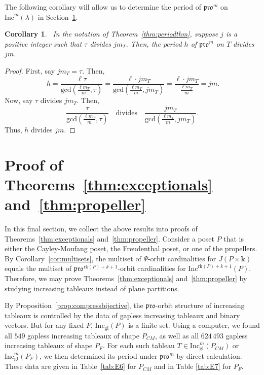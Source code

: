 \documentclass[12pt]{amsart}
\newtheorem{corollary}[theorem]{Corollary}
\theoremstyle{definition}
\theoremstyle{remark}
\numberwithin{equation}{section}
\newcommand{\inc}{\ensuremath{\mathrm{Inc}}}
\newcommand{\incgl}{\inc_{\mathrm{gl}}}
\newcommand{\pro}{\mathfrak{pro}}
\newcommand{\rank}{\ensuremath{\mathrm{rk}}}
\begin{document}
The following corollary will allow us to determine the period of $\pro^m$ on $\inc^m(\lambda)$ in Section~\ref{sec:arithmetic}. 
\\
\begin{corollary}~\label{corr:pdbound}
In the notation of Theorem~\ref{thm:periodthm}, suppose $j$ is a positive integer such that $\tau$ divides $j m_T$. Then, the period $h$ of $\pro^m$ on $T$ divides $j m$. 
\end{corollary} 
\begin{proof}
First, say $j m_T = \tau$. Then,
\begin{equation}~\label{eq:pdbound} h=  \frac{\ell \tau}{\text{gcd}(\frac{\ell m_T}{m},\tau)} = \frac{\ell \cdot j m_T}{\text{gcd}(\frac{\ell m_T}{m},j m_T)} = \frac{\ell \cdot j m_T}{\frac{\ell m_T}{m}} = jm. 
\end{equation}
Now, say $\tau$ divides $jm_T$. Then, \[ \frac{\tau}{\text{gcd}(\frac{\ell m_T}{m},\tau)} \ \ \  \text{    divides   } \ \ \ \frac{j m_T}{\text{gcd}(\frac{\ell m_T}{m},j m_T)}.\] Thus, $h$ divides $j m$. 
\end{proof}

\section{Proof of Theorems~\ref{thm:exceptionals} and~\ref{thm:propeller}}\label{sec:arithmetic}

In this final section, we collect the above results into proofs of Theorems~\ref{thm:exceptionals} and~\ref{thm:propeller}. Consider a poset $P$ that is either the Cayley-Moufang poset, the Freudenthal poset, or one of the propellers. By Corollary~\ref{cor:multisets},  the multiset of $\Psi$-orbit cardinalities for $J(P \times \mathbf{k})$ equals the multiset of $\pro^{\rank(P)+ k+1}$-orbit cardinalities for $\inc^{ \rank(P)+ k+1}(P)$. Therefore, we may prove Theorems~\ref{thm:exceptionals} and~\ref{thm:propeller} by studying increasing tableaux instead of plane partitions. 

By Proposition~\ref{prop:compressbijective}, the $\pro$-orbit structure of increasing tableaux is controlled by the data of gapless increasing tableaux and binary vectors. But for any fixed $P$, $\incgl(P)$ is a finite set. Using a computer, we found all $549$ gapless increasing tableaux of shape $P_{CM}$, as well as all $624\, 493$ gapless increasing tableaux of shape $P_F$. For each such tableau $T \in \incgl^m(P_{CM})$ or $\incgl^m(P_F)$, we then determined its period under $\pro^m$ by direct calculation. These data are given in Table~\ref{tab:E6} for $P_{CM}$ and in Table \ref{tab:E7} for $P_F$. 
\end{document}
